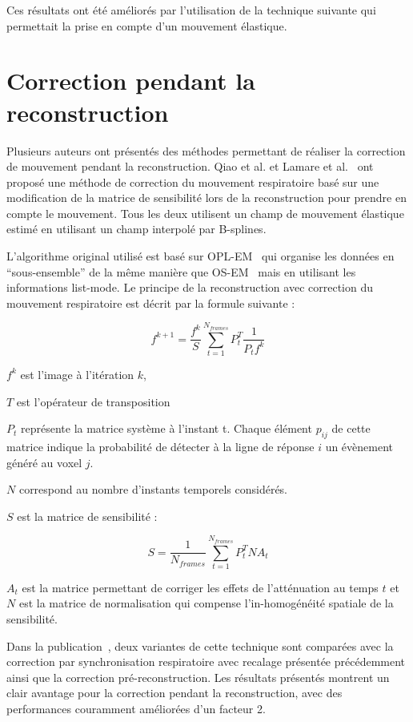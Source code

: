 Ces résultats ont été améliorés par l'utilisation de la technique suivante qui permettait la prise en compte d'un mouvement élastique.

\section{Correction pendant la reconstruction}


Plusieurs auteurs ont présentés des méthodes permettant de réaliser la correction de mouvement pendant la reconstruction. Qiao et al.\cite{qiao2006motion} et Lamare et al.~\cite{lamare2007list} ont proposé une méthode de correction du mouvement respiratoire basé sur une modification de la matrice de sensibilité lors de la reconstruction pour prendre en compte le mouvement. Tous les deux utilisent un champ de mouvement élastique estimé en utilisant un champ interpolé par B-splines.

L'algorithme original utilisé est basé sur OPL-EM~\cite{reader2002one} qui organise les données en ``sous-ensemble'' de la même manière que OS-EM~\cite{hudson1994accelerated} mais en utilisant les informations list-mode. Le principe de la reconstruction avec correction du mouvement respiratoire est décrit par la formule suivante :

\label{lab:corrMatSyst}
\begin{equation}
 f^{k+1}=\frac{f^k}{S} \sum_{t=1}^{N_{frames}} P_t^T \frac{1}{P_t f^k} 
\end{equation}

$f^k$ est l'image à l'itération $k$,

$T$ est l'opérateur de transposition

$P_t$ représente la matrice système à l'instant t. Chaque élément $p_{ij}$ de cette matrice indique la probabilité de détecter à la ligne de réponse $i$ un évènement généré au voxel $j$. 

$N$ correspond au nombre d'instants temporels considérés.

$S$ est la matrice de sensibilité :

\begin{equation}
 S=\frac{1}{N_{frames}} \sum_{t=1}^{N_{frames}} P_t^T N A_t 
\end{equation}

 $A_t$ est la matrice permettant de corriger les effets de l'atténuation au temps $t$ et $N$ est la matrice de normalisation qui compense l'in-homogénéité spatiale de la sensibilité.

Dans la publication~\cite{lamare2007list}, deux variantes de cette technique sont comparées avec la correction par synchronisation respiratoire avec recalage présentée précédemment ainsi que la correction pré-reconstruction. Les résultats présentés montrent un clair avantage pour la correction pendant la reconstruction, avec des performances couramment améliorées d'un facteur 2. 

